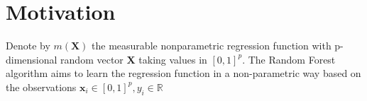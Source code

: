 \documentclass[twoside]{article}
\begin{document}

\section{Motivation}
Denote by $m(\mathbf{X})$ the measurable nonparametric regression function with p-dimensional random vector $\mathbf{X}$ taking values in $[0,1]^p$. The Random Forest algorithm aims to learn the 
 regression function in a non-parametric way based on the observations $\mathbf{x}_i \in [0,1]^p,y_i\in\mathbb{R}$

\citet{chi2022asymptotic}

\newpage


\end{document}
